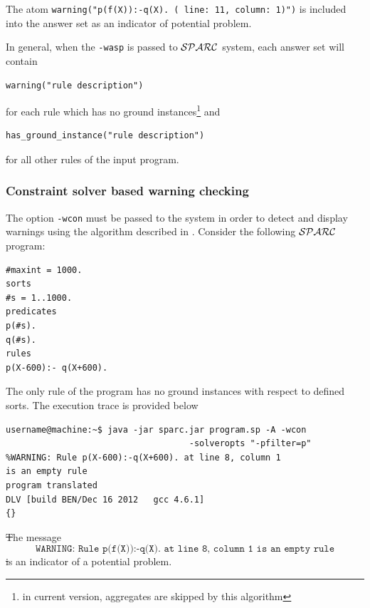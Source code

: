 \documentclass[12pt, letterpaper]{article}
\begin{document}
The atom \texttt{warning("p(f(X)):-q(X). ( line: 11, column: 1)")} is included into the answer set as an indicator of potential problem.

In general, when the \texttt{-wasp} is passed to ${\cal SPARC}$ system, each answer set will contain 
\begin{verbatim}
warning("rule description") 
\end{verbatim}
for each rule which has no ground instances\footnote{in current version, aggregates are skipped by this algorithm} and 
\begin{verbatim}
has_ground_instance("rule description")
\end{verbatim}
\st
for all other rules of the input program.
\subsubsection{Constraint solver based warning checking}\label{clp_type_warnings}

The option \texttt{-wcon} must be passed to the  system  in order to detect and display warnings using the algorithm described in \cite{sparc}.
Consider the following ${\cal SPARC}$ program:

\begin{verbatim}
#maxint = 1000.
sorts
#s = 1..1000.
predicates
p(#s).
q(#s).
rules
p(X-600):- q(X+600).
\end{verbatim}

The only rule of the program has no ground instances with respect to defined sorts.
The execution trace is provided below
\begin{verbatim}
username@machine:~$ java -jar sparc.jar program.sp -A -wcon 
                                    -solveropts "-pfilter=p"
%WARNING: Rule p(X-600):-q(X+600). at line 8, column 1 
is an empty rule
program translated
DLV [build BEN/Dec 16 2012   gcc 4.6.1]
{}
\end{verbatim}

\st The message 
\begin{equation*}
\texttt{WARNING: Rule p(f(X)):-q(X). at line 8, column 1 is an empty rule} 
\end{equation*}
\st is an indicator of a potential problem.
\end{document}
